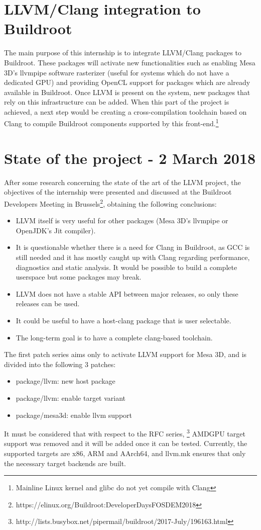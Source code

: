 \documentclass[12pt,a4paper,oneside]{article}
\begin{document}
\newpage
\section{LLVM/Clang integration to Buildroot} \label{LLVM/Clang integration to Buildroot}

The main purpose of this internship is to integrate LLVM/Clang packages to
Buildroot. These packages will activate new functionalities such as enabling
Mesa 3D's llvmpipe software rasterizer (useful for systems which do not have a
dedicated GPU) and providing OpenCL support for packages which are already
available in Buildroot. Once LLVM is present on the system, new packages
that rely on this infrastructure can be added. When this part of the project is
achieved, a next step would be creating a cross-compilation toolchain based on
Clang to compile Buildroot components supported by this front-end.\footnote{Mainline
Linux kernel and glibc do not yet compile with Clang}

\section*{State of the project - 2 March 2018}
After some research concerning the state of the art of the LLVM project, the objectives
of the internship were presented and discussed at the Buildroot Developers Meeting
in Brussels\footnote{https://elinux.org/Buildroot:DeveloperDaysFOSDEM2018}, obtaining
the following conclusions:
\begin{itemize}
  \item LLVM itself is very useful for other packages (Mesa 3D's llvmpipe or OpenJDK's
        Jit compiler).
  \item It is questionable whether there is a need for Clang in Buildroot, as GCC
        is still needed and it has mostly caught up with Clang regarding performance,
        diagnostics and static analysis. It would be possible to build a complete
        userspace but some packages may break.
  \item LLVM does not have a stable API between major releases, so only these releases
        can be used.
  \item It could be useful to have a host-clang package that is user selectable.
  \item The long-term goal is to have a complete clang-based toolchain.
\end{itemize}
The first patch series aims only to activate LLVM support for Mesa 3D, and is divided
into the following 3 patches:
\begin{itemize}
  \item package/llvm: new host package
  \item package/llvm: enable target variant
  \item package/mesa3d: enable llvm support
\end{itemize}
It must be considered that with respect to the RFC series,
\footnote{http://lists.busybox.net/pipermail/buildroot/2017-July/196163.html}
AMDGPU target support was removed and it will be added once it can be tested.
Currently, the supported targets are x86, ARM and AArch64, and llvm.mk ensures
that only the necessary target backends are built.
\end{document}
